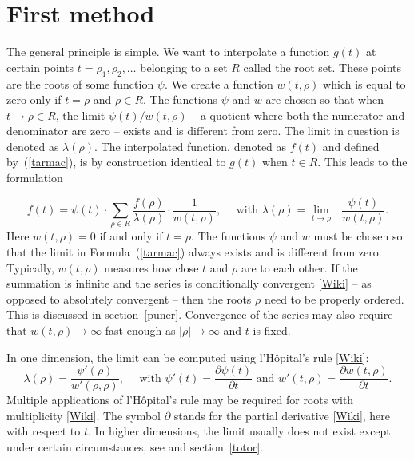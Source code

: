 \documentclass[oneside,10pt]{book}
\begin{document}
\section{First method}

The general principle is simple. We want to interpolate a function $g(t)$ at certain points $t = \rho_1, \rho_2,\dots$ belonging to a set $R$ called the root set. These points  are the roots of some function $\psi$. We create a function $w(t,\rho)$ which is equal to zero only if $t=\rho$ and $\rho\in R$. The functions $\psi$ and $w$ are chosen so that when $t\rightarrow \rho\in R$, the limit
$\psi(t)/w(t,\rho)$ -- a quotient where both the numerator and denominator are zero -- exists and is different from zero. The limit in question is denoted as $\lambda(\rho)$. The interpolated function, denoted as $f(t)$ and defined by~(\ref{tarmac}), is by construction  identical to $g(t)$ when $t\in R$.  This leads to the formulation

\begin{equation}
f(t)=\psi(t)\cdot \sum_{\rho\in R} \frac{f(\rho)}{\lambda(\rho)}\cdot \frac{1}{w(t,\rho)}, \quad \text{ with } \lambda(\rho) =   \lim_{t\rightarrow \rho} \text{ } \frac{\psi(t)}{w(t,\rho)}.\label{tarmac}
\end{equation}
Here $w(t,\rho) = 0$ if and only if $t=\rho$. The functions $\psi$ and $w$ must be chosen so that the limit in
 Formula~(\ref{tarmac}) always exists and is different from zero. Typically, $w(t,\rho)$ measures how close $t$ and $\rho$ are to each other. If the summation is infinite and the series is
\textcolor{index}{conditionally convergent} [\href{https://en.wikipedia.org/wiki/Conditional_convergence}{Wiki}] -- as opposed to \textcolor{index}{absolutely convergent} -- then the roots $\rho$ need to be properly ordered. This is discussed in section~\ref{puner}. Convergence of the series may also require that
 $w(t,\rho) \rightarrow \infty$ fast enough as $|\rho|\rightarrow\infty$ and $t$ is fixed.

In one dimension, the limit can be computed using l'Hôpital's rule [\href{https://en.wikipedia.org/wiki/L\%27H\%C3\%B4pital\%27s_rule}{Wiki}]:
$$\lambda(\rho) = \frac{\psi'(\rho)}{w'(\rho,\rho)}, \quad \text{ with } \psi'(t)=\frac{\partial \psi(t)}{\partial t} \text{ and }
w'(t,\rho) = \frac{\partial w(t,\rho)}{\partial t}.$$
Multiple applications of l'Hôpital's rule may be required for \textcolor{index}{roots with multiplicity} [\href{https://en.wikipedia.org/wiki/Multiplicity_(mathematics)}{Wiki}].
The symbol $\partial$ stands for the
 \textcolor{index}{partial derivative} [\href{https://en.wikipedia.org/wiki/Partial_derivative}{Wiki}], here with respect to $t$. In higher dimensions, the limit usually does not exist except under certain circumstances, see \cite{13rob} and
 section~\ref{totor}.
\end{document}
